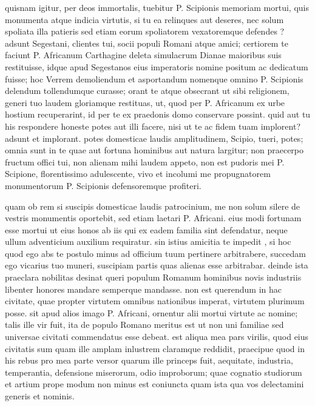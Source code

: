  quisnam igitur, per deos immortalis, tuebitur P. Scipionis memoriam mortui, quis monumenta atque indicia virtutis, si tu ea relinques aut deseres, nec solum spoliata illa patieris sed etiam eorum spoliatorem vexatoremque defendes ? adsunt Segestani, clientes tui, socii populi Romani atque amici; certiorem te faciunt P. Africanum Carthagine deleta simulacrum Dianae maioribus suis restituisse, idque apud Segestanos eius imperatoris nomine positum ac dedicatum fuisse; hoc Verrem demoliendum et asportandum nomenque omnino P. Scipionis delendum tollendumque curasse; orant te atque obsecrant ut sibi religionem, generi tuo laudem gloriamque restituas, ut, quod per P. Africanum ex urbe hostium recuperarint, id per te ex praedonis domo conservare possint. quid aut tu his respondere honeste potes aut illi facere, nisi ut te ac fidem tuam implorent? adsunt et implorant. potes domesticae laudis amplitudinem, Scipio, tueri, potes; omnia sunt in te quae aut fortuna hominibus aut natura largitur; non praecerpo fructum offici tui, non alienam mihi laudem appeto, non est pudoris mei P. Scipione, florentissimo adulescente, vivo et incolumi me propugnatorem monumentorum P. Scipionis defensoremque profiteri.

 quam ob rem si suscipis domesticae laudis patrocinium, me non solum silere de vestris monumentis oportebit, sed etiam laetari P. Africani. eius modi fortunam esse mortui ut eius honos ab iis qui ex eadem familia sint defendatur, neque ullum adventicium auxilium requiratur. sin istius amicitia te impedit , si hoc quod ego abs te postulo minus ad officium tuum pertinere arbitrabere, succedam ego vicarius tuo muneri, suscipiam partis quas alienas esse arbitrabar. deinde ista praeclara nobilitas desinat queri populum Romanum hominibus novis industriis libenter honores mandare semperque mandasse. non est querendum in hac civitate, quae propter virtutem omnibus nationibus imperat, virtutem plurimum posse. sit apud alios imago P. Africani, ornentur alii mortui virtute ac nomine; talis ille vir fuit, ita de populo Romano meritus est ut non uni familiae sed universae civitati commendatus esse debeat. est aliqua mea pars virilis, quod eius civitatis sum quam ille amplam inlustrem claramque reddidit, praecipue quod in his rebus pro mea parte versor quarum ille princeps fuit, aequitate, industria, temperantia, defensione miserorum, odio improborum; quae cognatio studiorum et artium prope modum non minus est coniuncta quam ista qua vos delectamini generis et nominis.


